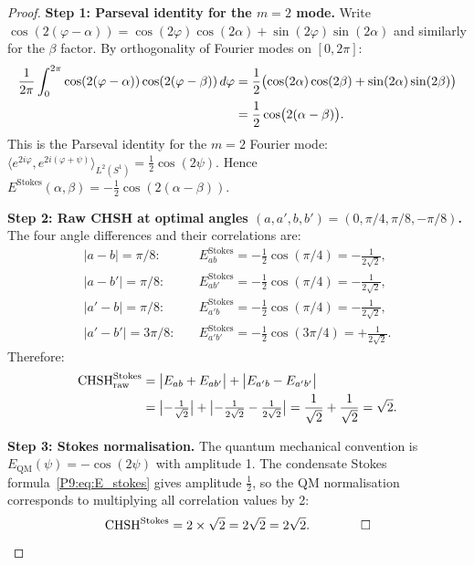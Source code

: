 \documentclass[11pt,a4paper]{article}
\theoremstyle{definition}
\theoremstyle{remark}
\newcommand{\CHSH}{\mathrm{CHSH}}
\newcommand{\Tsirelson}{2\sqrt{2}}
\begin{document}
\begin{proof}
\textbf{Step 1: Parseval identity for the $m=2$ mode.}
Write $\cos(2(\varphi-\alpha)) = \cos(2\varphi)\cos(2\alpha)+\sin(2\varphi)\sin(2\alpha)$
and similarly for the $\beta$ factor.
By orthogonality of Fourier modes on $[0,2\pi]$:
\begin{align}
  \frac{1}{2\pi}\int_0^{2\pi}\cos(2(\varphi-\alpha))\cos(2(\varphi-\beta))\,d\varphi
  &= \frac{1}{2}\bigl(\cos(2\alpha)\cos(2\beta)+\sin(2\alpha)\sin(2\beta)\bigr) \notag\\
  &= \frac{1}{2}\cos\bigl(2(\alpha-\beta)\bigr).
  \label{P9:eq:parseval_m2}
\end{align}
This is the Parseval identity for the $m=2$ Fourier mode:
$\langle e^{2i\varphi},e^{2i(\varphi+\psi)}\rangle_{L^2(S^1)} = \tfrac{1}{2}\cos(2\psi)$.
Hence $E^\mathrm{Stokes}(\alpha,\beta) = -\tfrac{1}{2}\cos(2(\alpha-\beta))$.
 
\textbf{Step 2: Raw CHSH at optimal angles $(a,a',b,b')=(0,\pi/4,\pi/8,-\pi/8)$.}
The four angle differences and their correlations are:
\begin{align*}
  |a-b|   = \pi/8:&\quad  E^\mathrm{Stokes}_{ab}   = -\tfrac{1}{2}\cos(\pi/4) = -\tfrac{1}{2\sqrt{2}},\\
  |a-b'|  = \pi/8:&\quad  E^\mathrm{Stokes}_{ab'}  = -\tfrac{1}{2}\cos(\pi/4) = -\tfrac{1}{2\sqrt{2}},\\
  |a'-b|  = \pi/8:&\quad  E^\mathrm{Stokes}_{a'b}  = -\tfrac{1}{2}\cos(\pi/4) = -\tfrac{1}{2\sqrt{2}},\\
  |a'-b'| = 3\pi/8:&\quad E^\mathrm{Stokes}_{a'b'} = -\tfrac{1}{2}\cos(3\pi/4) = +\tfrac{1}{2\sqrt{2}}.
\end{align*}
Therefore:
\begin{align}
  \CHSH^\mathrm{Stokes}_\mathrm{raw}
  &= \bigl|E_{ab}+E_{ab'}\bigr| + \bigl|E_{a'b}-E_{a'b'}\bigr| \notag\\
  &= \bigl|{-\tfrac{1}{\sqrt{2}}}\bigr|
   + \bigl|{-\tfrac{1}{2\sqrt{2}}-\tfrac{1}{2\sqrt{2}}}\bigr|
  = \frac{1}{\sqrt{2}} + \frac{1}{\sqrt{2}} = \sqrt{2}.
\end{align}
 
\textbf{Step 3: Stokes normalisation.}
The quantum mechanical convention is $E_\mathrm{QM}(\psi)=-\cos(2\psi)$
with amplitude 1. The condensate Stokes formula~\eqref{P9:eq:E_stokes} gives
amplitude $\tfrac{1}{2}$, so the QM normalisation corresponds to multiplying
all correlation values by 2:
\begin{equation}
  \CHSH^\mathrm{Stokes}
  = 2\times\sqrt{2} = 2\sqrt{2} = \Tsirelson.
  \qquad\qed
\end{equation}
\end{proof}
 
\end{document}
